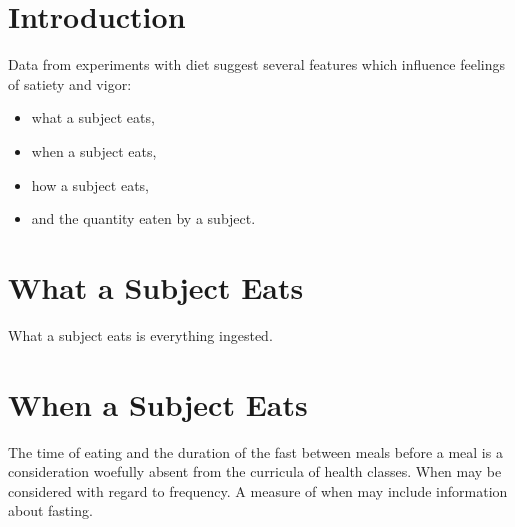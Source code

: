 \section{Introduction}
Data from experiments with diet suggest several features which influence feelings of satiety and vigor:
\begin{itemize}
    \item what a subject eats,
    \item when a subject eats,
    \item how a subject eats,
    \item and the quantity eaten by a subject.
\end{itemize}

\section{ What a Subject Eats }
What a subject eats is everything ingested.

\section{ When a Subject Eats }
The time of eating and the duration of the fast between meals before a meal is a consideration woefully absent from the curricula of health classes. When may be considered with regard to frequency. A measure of when may include information about fasting. 
